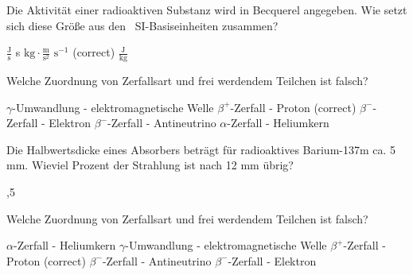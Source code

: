 \documentclass[11pt]{exam}
\begin{document}
\setlength{\voffset}{-0.5in}
\setlength{\headsep}{5pt}

\hspace{2mm}
 \hspace{5mm}
\vspace{4mm}

\begin{questions}

\question Die Aktivität einer radioaktiven Substanz wird in Becquerel angegeben. Wie setzt sich diese Größe aus den  SI-Basiseinheiten zusammen?

\begin{choices}
	\choice \( \frac{\text{J}}{\text{s}} \)
	\choice s
	\choice \( \text{kg}\cdot\frac{\text{m}}{\text{s}^2} \)
	\choice \( \text{s}^{-1} \) (correct)
	\choice \( \frac{\text{J}}{\text{kg}} \)
\end{choices}

\vspace{3mm}\question Welche Zuordnung von Zerfallsart und frei werdendem Teilchen ist falsch?

\begin{choices}
	\choice \( \gamma \)-Umwandlung - elektromagnetische Welle
	\choice \( \beta^+ \)-Zerfall - Proton (correct)
	\choice \( \beta^- \)-Zerfall - Elektron
	\choice \( \beta^- \)-Zerfall - Antineutrino
	\choice \( \alpha \)-Zerfall - Heliumkern
\end{choices}

\vspace{3mm}\question Die Halbwertsdicke eines Absorbers beträgt für radioaktives Barium-137m ca. 5 mm. Wieviel Prozent der Strahlung ist nach 12 mm übrig?

\begin{choices}
	,5 %
\end{choices}

\vspace{3mm}\question Welche Zuordnung von Zerfallsart und frei werdendem Teilchen ist falsch?

\begin{choices}
	\choice \( \alpha \)-Zerfall - Heliumkern
	\choice \( \gamma \)-Umwandlung - elektromagnetische Welle
	\choice \( \beta^+ \)-Zerfall - Proton (correct)
	\choice \( \beta^- \)-Zerfall - Antineutrino
	\choice \( \beta^- \)-Zerfall - Elektron
\end{choices}


\end{questions}
\end{document}
